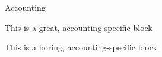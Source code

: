 

Accounting

This is a great, accounting-specific block

This is a boring, accounting-specific block
